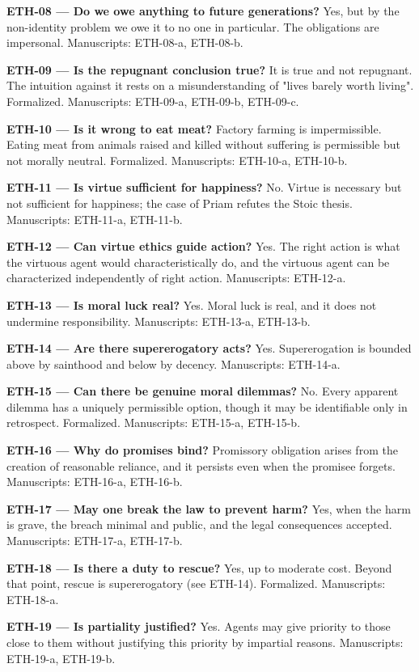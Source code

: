 \documentclass[10pt]{article}
\begin{document}
\textbf{ETH-08 --- Do we owe anything to future generations?} Yes, but by the non-identity problem we owe it to no one in particular. The obligations are impersonal. Manuscripts: ETH-08-a, ETH-08-b.

\textbf{ETH-09 --- Is the repugnant conclusion true?} It is true and not repugnant. The intuition against it rests on a misunderstanding of "lives barely worth living". Formalized. Manuscripts: ETH-09-a, ETH-09-b, ETH-09-c.

\textbf{ETH-10 --- Is it wrong to eat meat?} Factory farming is impermissible. Eating meat from animals raised and killed without suffering is permissible but not morally neutral. Formalized. Manuscripts: ETH-10-a, ETH-10-b.

\textbf{ETH-11 --- Is virtue sufficient for happiness?} No. Virtue is necessary but not sufficient for happiness; the case of Priam refutes the Stoic thesis. Manuscripts: ETH-11-a, ETH-11-b.

\textbf{ETH-12 --- Can virtue ethics guide action?} Yes. The right action is what the virtuous agent would characteristically do, and the virtuous agent can be characterized independently of right action. Manuscripts: ETH-12-a.

\textbf{ETH-13 --- Is moral luck real?} Yes. Moral luck is real, and it does not undermine responsibility. Manuscripts: ETH-13-a, ETH-13-b.

\textbf{ETH-14 --- Are there supererogatory acts?} Yes. Supererogation is bounded above by sainthood and below by decency. Manuscripts: ETH-14-a.

\textbf{ETH-15 --- Can there be genuine moral dilemmas?} No. Every apparent dilemma has a uniquely permissible option, though it may be identifiable only in retrospect. Formalized. Manuscripts: ETH-15-a, ETH-15-b.

\textbf{ETH-16 --- Why do promises bind?} Promissory obligation arises from the creation of reasonable reliance, and it persists even when the promisee forgets. Manuscripts: ETH-16-a, ETH-16-b.

\textbf{ETH-17 --- May one break the law to prevent harm?} Yes, when the harm is grave, the breach minimal and public, and the legal consequences accepted. Manuscripts: ETH-17-a, ETH-17-b.

\textbf{ETH-18 --- Is there a duty to rescue?} Yes, up to moderate cost. Beyond that point, rescue is supererogatory (see ETH-14). Formalized. Manuscripts: ETH-18-a.

\textbf{ETH-19 --- Is partiality justified?} Yes. Agents may give priority to those close to them without justifying this priority by impartial reasons. Manuscripts: ETH-19-a, ETH-19-b.
\end{document}
